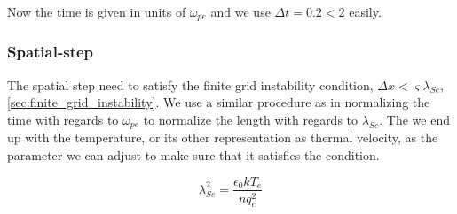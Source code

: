         Now the time is given in units of \(\omega_{pe}\) and we use \(\Delta t = 0.2 < 2\) easily.

        \subsubsection{Spatial-step}
        The spatial step need to satisfy the finite grid instability condition,
        \(\Delta x < \varsigma \lambda_{Se}\), \cref{sec:finite_grid_instability}.
        We use a similar procedure as in normalizing the time with regards to \(\omega_{pe}\)
        to normalize the length with regards to \(\lambda_{Se}\). The we end up with
        the temperature, or its other representation as thermal velocity, as the parameter we can adjust to make sure that it satisfies the
        condition.

        \begin{equation}
            \lambda_{Se}^2 = \frac{\epsilon_0 kT_e}{nq^2_e}
        \end{equation}
